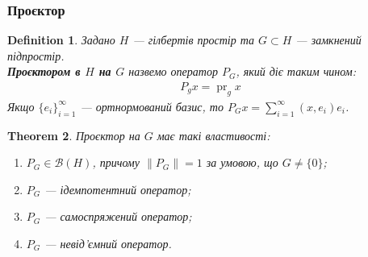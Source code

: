 \documentclass[a4paper, 10pt]{article}
\theoremstyle{theoremdd}
\newtheorem{theorem}{Theorem}[subsection]
\theoremstyle{theoremdd}
\newtheorem{definition}[theorem]{Definition}
\theoremstyle{theoremdd}
\theoremstyle{theoremdd}
\theoremstyle{theoremdd}
\theoremstyle{theoremdd}
\theoremstyle{theoremdd}
\theoremstyle{theoremdd}
\DeclareMathOperator{\pr}{pr}
\begin{document}
\subsubsection{Проєктор}
\begin{definition}
Задано $H$ --- гілбертів простір та $G \subset H$ --- замкнений підпростір.\\
\textbf{Проєктором в $H$ на $G$} назвемо оператор $P_G$, який діє таким чином:
\begin{align*}
P_g x = \pr_g x
\end{align*}
Якщо $\{e_i\}_{i=1}^\infty$ --- ортнормований базис, то $P_G x = \displaystyle\sum_{i=1}^\infty (x,e_i)e_i$.
\end{definition}

\begin{theorem}
Проєктор на $G$ має такі властивості:
\begin{enumerate}[nosep,wide=0pt,label={\arabic*)}]
\item $P_G \in \mathcal{B}(H)$, причому $\|P_G\| = 1$ за умовою, що $G \neq \{0\}$;
\item $P_G$ --- ідемпотентний оператор;
\item $P_G$ --- самоспряжений оператор;
\item $P_G$ --- невід'ємний оператор.
\end{enumerate}
\end{theorem}
\end{document}
